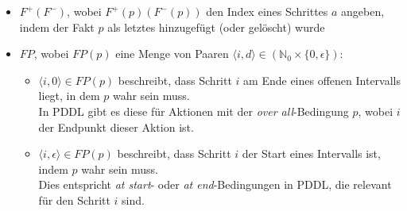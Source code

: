 \begin{itemize}
    \item $F^+(F^-)$, wobei $F^+(p)(F^-(p))$ den Index eines Schrittes $a$ angeben, indem der Fakt $p$ als letztes hinzugefügt (oder gelöscht) wurde
    \item $FP$, wobei $FP(p)$ eine Menge von Paaren $\langle i,d \rangle \in (\mathbb{N}_0 \times \{0,\epsilon\})$:\\
    \begin{itemize}
        \item $\langle i,0 \rangle \in FP(p)$ beschreibt, dass Schritt $i$ am Ende eines offenen Intervalls liegt, in dem $p$ wahr sein muss.\\
        In \ac{PDDL} gibt es diese für Aktionen mit der \emph{over all}-Bedingung $p$, wobei $i$ der Endpunkt dieser Aktion ist.
        \item $\langle i,\epsilon \rangle \in FP(p)$ beschreibt, dass Schritt $i$ der Start eines Intervalls ist, indem $p$ wahr sein muss.\\
        Dies entspricht \emph{at start}- oder \emph{at end}-Bedingungen in \ac{PDDL}, die relevant für den Schritt $i$ sind.
    \end{itemize}
\end{itemize}

